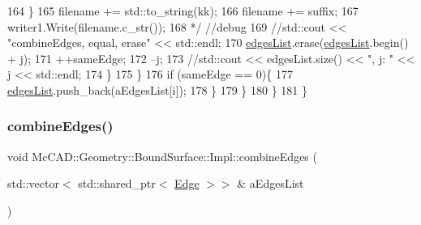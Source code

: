 \begin{DoxyCode}
164 \textcolor{comment}{                    \}}
165 \textcolor{comment}{                    filename += std::to\_string(kk);}
166 \textcolor{comment}{                    filename += suffix;}
167 \textcolor{comment}{                    writer1.Write(filename.c\_str());}
168 \textcolor{comment}{                    */} \textcolor{comment}{//debug}
169                     \textcolor{comment}{//std::cout << "combineEdges, equal, erase" << std::endl;}
170                     \hyperlink{classMcCAD_1_1Geometry_1_1BoundSurface_1_1Impl_a92e901c25606e27f9d11e0837c096f59}{edgesList}.erase(\hyperlink{classMcCAD_1_1Geometry_1_1BoundSurface_1_1Impl_a92e901c25606e27f9d11e0837c096f59}{edgesList}.begin() + j);
171                     ++sameEdge;
172                     --j;
173                     \textcolor{comment}{//std::cout << edgesList.size() << ", j: " << j << std::endl;}
174                 \}
175             \}
176             \textcolor{keywordflow}{if} (sameEdge == 0)\{
177                 \hyperlink{classMcCAD_1_1Geometry_1_1BoundSurface_1_1Impl_a92e901c25606e27f9d11e0837c096f59}{edgesList}.push\_back(aEdgesList[i]);
178             \}
179         \}
180     \}
181 \}
\end{DoxyCode}
\mbox{\label{classMcCAD_1_1Geometry_1_1BoundSurface_1_1Impl_ac4d7badfc8a2ea9448e49f325a1b4636}} 
\subsubsection{\texorpdfstring{combine\+Edges()}{combineEdges()}\hspace{0.1cm}{\footnotesize\ttfamily [2/2]}}
{\footnotesize\ttfamily void Mc\+C\+A\+D\+::\+Geometry\+::\+Bound\+Surface\+::\+Impl\+::combine\+Edges (\begin{DoxyParamCaption}\item[{std\+::vector$<$ std\+::shared\+\_\+ptr$<$ \hyperlink{classMcCAD_1_1Geometry_1_1Edge}{Edge} $>$$>$ \&}]{a\+Edges\+List }\end{DoxyParamCaption})}

\mbox{\label{classMcCAD_1_1Geometry_1_1BoundSurface_1_1Impl_ab2379be9047959a97d433699c13248a3}} 
